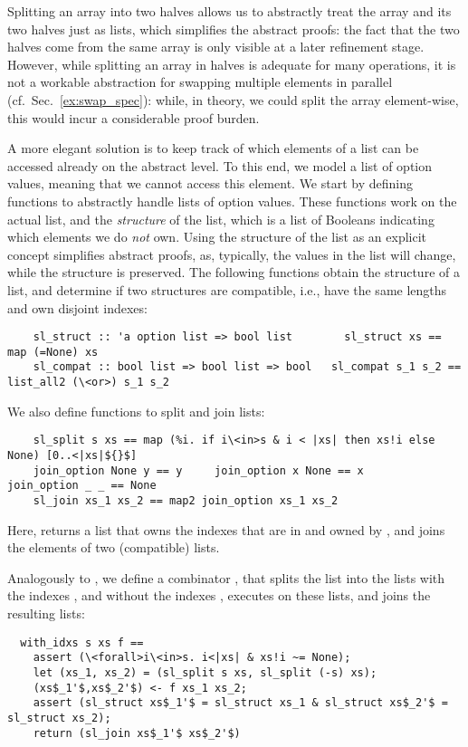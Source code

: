 \documentclass[sn-mathphys,Numbered]{sn-jnl}
\theoremstyle{thmstyleone}%
\theoremstyle{definition}%
\theoremstyle{thmstylethree}%
\begin{document}
  Splitting an array into two halves allows us to abstractly treat the array and its two halves just as lists,
  which simplifies the abstract proofs: the fact that the two halves come from the same array is only visible
  at a later refinement stage. However, while splitting an array in halves is adequate for many operations,
  it is not a workable abstraction for swapping multiple elements in parallel (cf.~Sec.~\ref{ex:swap_spec}):
  while, in theory, we could split the array element-wise, this would incur a considerable proof burden.

  A more elegant solution is to keep track of which elements of a list can be accessed already on the abstract level. To this end,
  we model a list of option values,  meaning that we cannot access this element.
  We start by defining functions to abstractly handle lists of option values.
  These functions work on the actual list, and the \emph{structure} of the list,
  which is a list of Booleans indicating which elements we do \emph{not} own.
  Using the structure of the list as an explicit concept simplifies abstract proofs, as, typically,
  the values in the list will change, while the structure is preserved.
  The following functions obtain the structure of a list, and determine if two
  structures are compatible, i.e., have the same lengths and own disjoint indexes:
  \begin{lstlisting}
    sl_struct :: 'a option list => bool list        sl_struct xs == map (=None) xs
    sl_compat :: bool list => bool list => bool   sl_compat s_1 s_2 == list_all2 (\<or>) s_1 s_2
  \end{lstlisting}
  We also define functions to split and join lists:
  \begin{lstlisting}
    sl_split s xs == map (%i. if i\<in>s & i < |xs| then xs!i else None) [0..<|xs|${}$]
    join_option None y == y     join_option x None == x      join_option _ _ == None
    sl_join xs_1 xs_2 == map2 join_option xs_1 xs_2
  \end{lstlisting}
  Here,  returns a list that owns the indexes that are in  and owned by ,
  and  joins the elements of two (compatible) lists.

  Analogously to , we define a combinator , that splits
  the list  into the lists with the indexes , and without the indexes , executes  on these lists,
  and joins the resulting lists:
  \begin{lstlisting}
  with_idxs s xs f ==
    assert (\<forall>i\<in>s. i<|xs| & xs!i ~= None);
    let (xs_1, xs_2) = (sl_split s xs, sl_split (-s) xs);
    (xs$_1'$,xs$_2'$) <- f xs_1 xs_2;
    assert (sl_struct xs$_1'$ = sl_struct xs_1 & sl_struct xs$_2'$ = sl_struct xs_2);
    return (sl_join xs$_1'$ xs$_2'$)
  \end{lstlisting}
\end{document}

